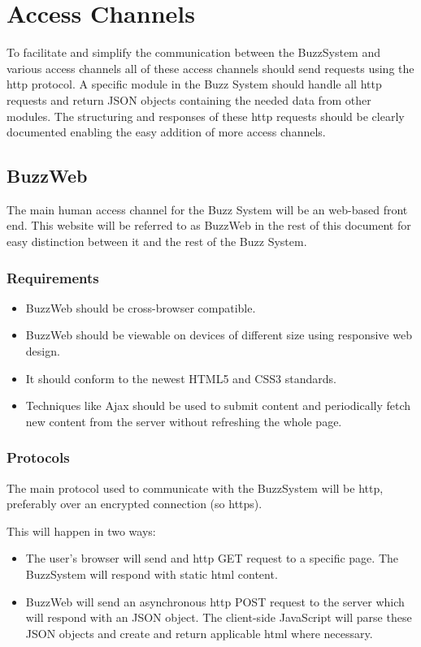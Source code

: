 \section{Access Channels} \label{AccessChannels}
To facilitate and simplify the communication between the BuzzSystem and various access channels all of these access channels should send requests using the http protocol. A specific module in the Buzz System should handle all http requests and return JSON objects containing the needed data from other modules. The structuring and responses of these http requests should be clearly documented enabling the easy addition of more access channels.

\subsection{BuzzWeb} \label{BuzzWeb}
The main human access channel for the Buzz System will be an web-based front end. This website will be referred to as BuzzWeb in the rest of this document for easy distinction between it and the rest of the Buzz System.
	\subsubsection{Requirements}
	\begin{itemize}
		\item BuzzWeb should be cross-browser compatible.
		\item BuzzWeb should be viewable on devices of different size using responsive web design.
		\item It should conform to the newest HTML5 and CSS3 standards.
		\item Techniques like Ajax should be used to submit content and periodically fetch new content from the server without refreshing the whole page. 
	\end{itemize}
		
	\subsubsection{Protocols}
	The main protocol used to communicate with the BuzzSystem will be http, preferably over an encrypted connection (so https). 
	
	This will happen in two ways: 
	\begin{itemize}
	\item The user's browser will send and http GET request to a specific page. The BuzzSystem will respond with static html content.
	\item BuzzWeb will send an asynchronous http POST request to the server which will respond with an JSON object. The client-side JavaScript will parse these JSON objects and create and return applicable html where necessary.
	\end{itemize}	
		
